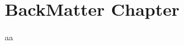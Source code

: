 \documentclass{systemProposal}
\date{\today}
\begin{document}
\chapter{BackMatter Chapter}
aa
\end{document}
